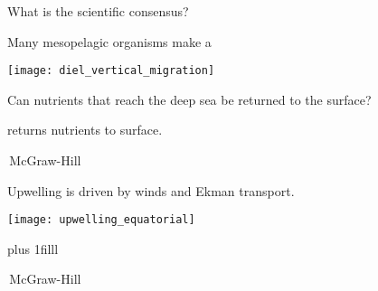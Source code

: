 \documentclass[t]{beamer}
\begin{document}

\begin{frame}[t]{What is the scientific consensus?}

\hangpara{}\pause

\vspace*{2\baselineskip}

\hangpara{}\pause

\vspace*{2\baselineskip}

\hangpara{}

\end{frame}



\begin{frame}[t]{Many mesopelagic organisms make a }

	{\centering
	\texttt{[image: diel\_vertical\_migration]}\par}

\end{frame}


\begin{frame}[t]{Can nutrients that reach the deep sea be returned to the surface?}
\end{frame}


{
\begin{frame}[b]{ returns nutrients to surface.}

\hfill\tiny\textcopyright\,McGraw-Hill
\end{frame}}


\begin{frame}[t]{Upwelling is driven by winds and Ekman transport.}

{\centering
\texttt{[image: upwelling\_equatorial]}\par}

\vskip0pt plus 1filll

\hfill\tiny\textcopyright\,McGraw-Hill
\end{frame}
\end{document}
